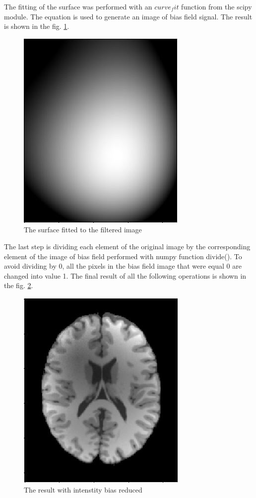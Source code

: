 The fitting of the surface was performed with an $curve_fit$ function from the scipy module. The equation is used to generate an image of bias field signal. The result is shown in the fig. \ref{fig: Module2_3}.
\begin{figure}[H]
\centering{}\includegraphics[scale=0.7]{figures/Module_02/m2_1}\caption{The surface fitted to the filtered image}
\label{fig: Module2_3}
\end{figure}
The last step is dividing each element of the original image by the corresponding element of the image of bias field performed with numpy function divide(). To avoid dividing by 0, all the pixels in the bias field image that were equal 0 are changed into value 1. The final result of all the following operations is shown in the fig. \ref{fig: Module2_4}.
\begin{figure}[H]
\centering{}\includegraphics[scale=0.7]{figures/Module_02/m2_4}\caption{The result with intenstity bias reduced}
\label{fig: Module2_4}
\end{figure}